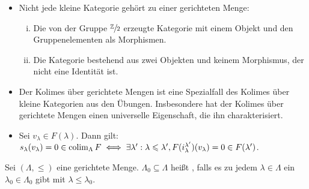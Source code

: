 \begin{bemerkung}[{name=[{gerichtete Kolimiten}]}]
	\leavevmode
	\begin{itemize}
		\item Nicht jede kleine Kategorie gehört zu einer gerichteten Menge:
		\begin{enumerate}[(i)]
			\item Die von der Gruppe $\sfrac{\mathbb{Z}}{2}$ erzeugte Kategorie mit einem Objekt und den Gruppenelementen als Morphismen.
			\item Die Kategorie bestehend aus zwei Objekten und keinem Morphismus, der nicht eine Identität ist.
		\end{enumerate}
		\item Der Kolimes über gerichtete Mengen ist eine Spezialfall des Kolimes über kleine Kategorien aus den Übungen. 
		Insbesondere hat der Kolimes über gerichtete Mengen einen universelle Eigenschaft, die ihn charakterisiert.
		\item Sei $v_\lambda \in F(\lambda)$. Dann gilt:
		\(
			s_\lambda(v_\lambda) =0 \in \operatorname*{colim}_\Lambda F \iff \exists \lambda' : \lambda \leqslant \lambda', F(i_\lambda^{\lambda'})(v_\lambda)=0 \in F(\lambda')
		\).
	\end{itemize}
\end{bemerkung}

\begin{definition}[{name=[kofinal]}]
	Sei $(\Lambda,\le)$ eine gerichtete Menge. $\Lambda_0 \subseteq \Lambda$ heißt , falls es zu jedem $\lambda \in \Lambda$ ein $\lambda_0 \in \Lambda_0$ gibt mit $\lambda\le \lambda_0$.
\end{definition}

